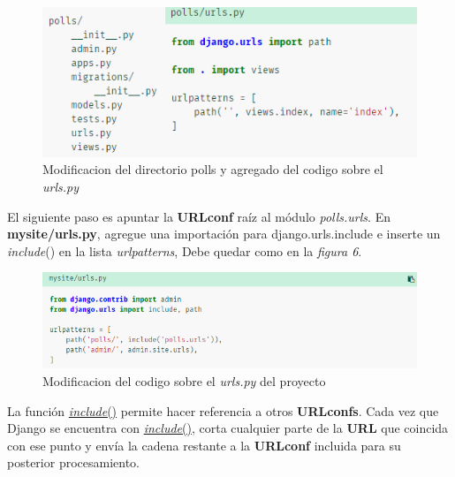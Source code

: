 \documentclass[10pt]{article}
\newcommand{\django}[1]{{\textcolor{G}{Django} #1}}
\begin{document}
\begin{figure}[H]
  \begin{center}
  	 \includegraphics{figuras/3/31/314/img2.png}	 
	 \renewcommand{\arraystretch}{1.3}
	 \caption{Modificacion del directorio polls y agregado del codigo sobre el \textit{urls.py}}
  \end{center}
\end{figure}

El siguiente paso es apuntar la \textbf{URLconf} raíz al módulo \textit{polls.urls}. En \textbf{mysite/urls.py}, agregue una importación para \textcolor{G}{django.urls.include} e inserte un \textcolor{B}{\textit{include}}() en la lista \textit{urlpatterns}, Debe quedar como en la \textit{figura 6}.

\begin{figure}[H]
  \begin{center}
  	 \includegraphics{figuras/3/31/314/img3.png}	 
	 \renewcommand{\arraystretch}{1.3}
	 \caption{Modificacion del codigo sobre el \textit{urls.py} del proyecto}
  \end{center}
\end{figure}

La función {\href{https://docs.djangoproject.com/en/3.0/ref/urls/#django.urls.include}{\textcolor{B}{\textit{include}}()}} permite hacer referencia a otros \textbf{URLconfs}. Cada vez que \django{} se encuentra con {\href{https://docs.djangoproject.com/en/3.0/ref/urls/#django.urls.include}{\textcolor{B}{\textit{include}}()}}, corta cualquier parte de la \textbf{URL} que coincida con ese punto y envía la cadena restante a la \textbf{URLconf} incluida para su posterior procesamiento.
\end{document}

